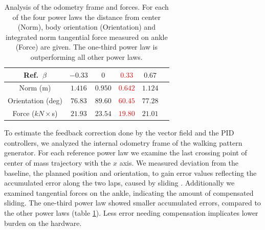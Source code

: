 \begin{table}[ht]
	\centering 
	\begin{tabular}{|| c || c | c | c | c ||c |} 
		\hline 
		\hline 
		Ref.~$\beta$        & $-0.33$  & $0$      & \textcolor{red}{$0.33$} & $0.67$   \\
		\hline  
		Norm     (m)        & $1.416$  & $0.950$  & \textcolor{red}{$0.642$} & $1.124$ \\   
		Orientation (deg)   & $76.83$  & $89.60$  & \textcolor{red}{$60.45$} & $77.28$ \\ 
		Force ($kN\times$s) & $21.93 $ & $23.54$  & \textcolor{red}{$19.80$} &$21.01$  \\ 
		\hline
		\hline 		  
	\end{tabular}
	\caption{Analysis of the odometry frame and forces. For each of the four power laws the distance from center (Norm), body orientation (Orientation) and integrated norm tangential force measured on ankle (Force) are given. The one-third power law is outperforming all other power laws.}
	\label{tab:odometry_drift}
	
\end{table}

To estimate the  feedback correction done by the vector field and the PID controllers, we analyzed the internal odometry frame of the walking pattern generator. For each reference power law we examine the last crossing point of center of mass trajectory with the $x$ axis. We measured deviation from the baseline, the planned position and orientation, to gain error values reflecting the accumulated error along the two laps, caused by sliding . Additionally we examined tangential forces on the ankle, indicating the amount of compensated sliding. The one-third power law showed smaller accumulated errors, compared to the other power laws (table \ref{tab:odometry_drift}). Less error needing compensation implicates lower burden on the hardware.
 


